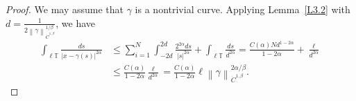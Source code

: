 \documentclass[reqno,centertags,12pt]{amsart}
\theoremstyle{definition}
\numberwithin{equation}{section}
\newcommand{\abs}[1]{\left\lvert#1\right\rvert}
\newcommand{\norm}[1]{\left\|#1\right\|}
\newcommand{\bbT}{{\mathbb{T}}}
\begin{document}
\begin{proof}
    We may assume that $\gamma$ is a nontrivial curve.
    Applying Lemma~\ref{L3.2} with
    $d = \frac{1}{2\norm{\gamma}_{\dot{C}^{1,\beta}}^{1/\beta}}$, we have
    \begin{align*}
        \int_{\ell\bbT}\frac{ds}{\abs{x - \gamma(s)}^{2\alpha}}
        &\leq \sum_{i=1}^{N}\int_{-2d}^{2d}\frac{2^{2\alpha}ds}{\abs{s}^{2\alpha}}
        + \int_{\ell\bbT}\frac{ds}{d^{2\alpha}}
        = \frac{C(\alpha)Nd^{1-2\alpha}}{1-2\alpha}
        + \frac{\ell}{d^{2\alpha}} \\
        &\leq \frac{C(\alpha)}{1 - 2\alpha}\frac{\ell}{d^{2\alpha}}
        = \frac{C(\alpha)}{1-2\alpha}\ell
        \norm{\gamma}_{\dot{C}^{1,\beta}}^{2\alpha/\beta}.
    \end{align*}


\end{proof}
\end{document}
